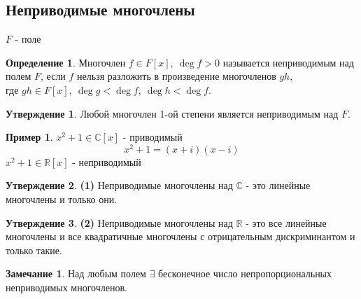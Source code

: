 \documentclass[a4paper, 12pt]{article}
\newcommand{\R}{\mathbb R}
\newcommand\tab[1][.5cm]{\hspace*{#1}}
\theoremstyle{definition}
\newtheorem*{definition}{Определение}
\newtheorem*{subtheorem}{Утверждение}
\newtheorem*{remark}{Замечание}
\newtheorem*{example1}{Пример}
\begin{document}
  \subsection{Неприводимые многочлены}
  $F$ - поле
  \begin{definition}
    Многочлен $f \in F[x], \ \deg f > 0$ называется неприводимым над полем $F$, если $f$ нельзя разложить в произведение многочленов $gh$, \\где $gh \in F[x], \ \deg g < \deg f, \ \deg h < \deg f$.
  \end{definition}
  \begin{subtheorem}
    Любой многочлен 1-ой степени является неприводимым над $F$. 
  \end{subtheorem}
  \begin{example1} 
    $x^2 + 1 \in \mathbb{C}[x]$ - приводимый
    $$x^2 + 1 = (x+i)(x-i)$$
    \tab[11cm]$x^2 + 1 \in \R[x]$ - неприводимый  
  \end{example1} 
  \begin{subtheorem}\textbf{(1)}
    Неприводимые многочлены над $\mathbb{C}$ - это линейные многочлены и только они. 
  \end{subtheorem}
  \begin{subtheorem}\textbf{(2)}
    Неприводимые многочлены над $\R$ - это все линейные многочлены и все квадратичные многочлены с отрицательным дискриминантом и только такие.  
  \end{subtheorem}
  \begin{remark}
    Над любым полем $\exists$ бесконечное число непропорциональных\\ неприводимых многочленов.
  \end{remark}   
\end{document}
